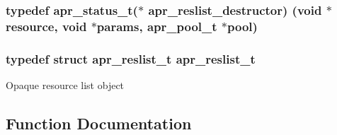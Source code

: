 \subsubsection[{\texorpdfstring{apr\+\_\+reslist\+\_\+destructor}{apr_reslist_destructor}}]{\setlength{\rightskip}{0pt plus 5cm}typedef {\bf apr\+\_\+status\+\_\+t}($\ast$ apr\+\_\+reslist\+\_\+destructor) ({\bf void} $\ast${\bf resource}, {\bf void} $\ast${\bf params}, {\bf apr\+\_\+pool\+\_\+t} $\ast${\bf pool})}\hypertarget{group__APR__Util__RL_gab642eccd03379810b6beb1e7bf009dad}{}\label{group__APR__Util__RL_gab642eccd03379810b6beb1e7bf009dad}
\subsubsection[{\texorpdfstring{apr\+\_\+reslist\+\_\+t}{apr_reslist_t}}]{\setlength{\rightskip}{0pt plus 5cm}typedef struct {\bf apr\+\_\+reslist\+\_\+t} {\bf apr\+\_\+reslist\+\_\+t}}\hypertarget{group__APR__Util__RL_ga670f6719dfeffe1037e063eaab7b82ac}{}\label{group__APR__Util__RL_ga670f6719dfeffe1037e063eaab7b82ac}
Opaque resource list object 

\subsection{Function Documentation}
